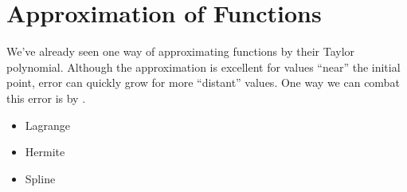 \chapter{Approximation of Functions}

We've already seen one way of approximating functions by their Taylor polynomial. Although the approximation is excellent for values ``near'' the initial point, error can quickly grow for more ``distant'' values. One way we can combat this error is by .

\begin{itemize}
    \item Lagrange
    \item Hermite
    \item Spline
\end{itemize}
